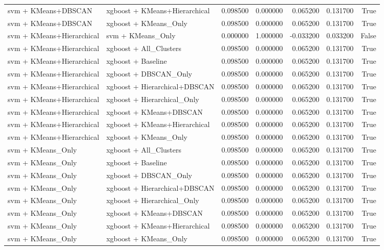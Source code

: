 \begin{tabular}{llrrrrr}
svm + KMeans+DBSCAN & xgboost + KMeans+Hierarchical & 0.098500 & 0.000000 & 0.065200 & 0.131700 & True \\
svm + KMeans+DBSCAN & xgboost + KMeans_Only & 0.098500 & 0.000000 & 0.065200 & 0.131700 & True \\
svm + KMeans+Hierarchical & svm + KMeans_Only & 0.000000 & 1.000000 & -0.033200 & 0.033200 & False \\
svm + KMeans+Hierarchical & xgboost + All_Clusters & 0.098500 & 0.000000 & 0.065200 & 0.131700 & True \\
svm + KMeans+Hierarchical & xgboost + Baseline & 0.098500 & 0.000000 & 0.065200 & 0.131700 & True \\
svm + KMeans+Hierarchical & xgboost + DBSCAN_Only & 0.098500 & 0.000000 & 0.065200 & 0.131700 & True \\
svm + KMeans+Hierarchical & xgboost + Hierarchical+DBSCAN & 0.098500 & 0.000000 & 0.065200 & 0.131700 & True \\
svm + KMeans+Hierarchical & xgboost + Hierarchical_Only & 0.098500 & 0.000000 & 0.065200 & 0.131700 & True \\
svm + KMeans+Hierarchical & xgboost + KMeans+DBSCAN & 0.098500 & 0.000000 & 0.065200 & 0.131700 & True \\
svm + KMeans+Hierarchical & xgboost + KMeans+Hierarchical & 0.098500 & 0.000000 & 0.065200 & 0.131700 & True \\
svm + KMeans+Hierarchical & xgboost + KMeans_Only & 0.098500 & 0.000000 & 0.065200 & 0.131700 & True \\
svm + KMeans_Only & xgboost + All_Clusters & 0.098500 & 0.000000 & 0.065200 & 0.131700 & True \\
svm + KMeans_Only & xgboost + Baseline & 0.098500 & 0.000000 & 0.065200 & 0.131700 & True \\
svm + KMeans_Only & xgboost + DBSCAN_Only & 0.098500 & 0.000000 & 0.065200 & 0.131700 & True \\
svm + KMeans_Only & xgboost + Hierarchical+DBSCAN & 0.098500 & 0.000000 & 0.065200 & 0.131700 & True \\
svm + KMeans_Only & xgboost + Hierarchical_Only & 0.098500 & 0.000000 & 0.065200 & 0.131700 & True \\
svm + KMeans_Only & xgboost + KMeans+DBSCAN & 0.098500 & 0.000000 & 0.065200 & 0.131700 & True \\
svm + KMeans_Only & xgboost + KMeans+Hierarchical & 0.098500 & 0.000000 & 0.065200 & 0.131700 & True \\
svm + KMeans_Only & xgboost + KMeans_Only & 0.098500 & 0.000000 & 0.065200 & 0.131700 & True \\

\end{tabular}
